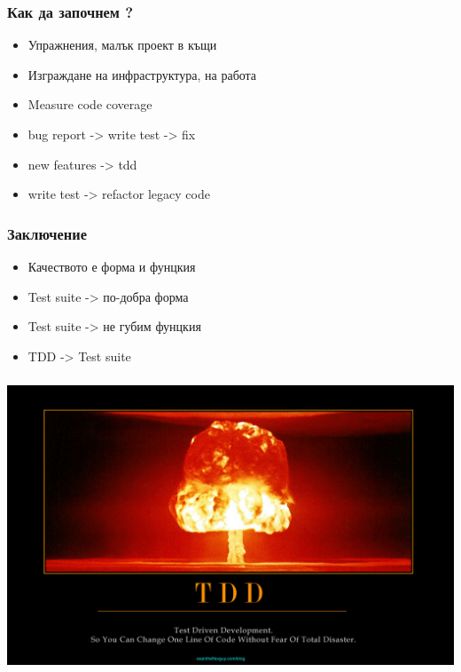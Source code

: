 \begin{frame}
  \frametitle{Как да започнем ?}
  \begin{itemize}
      \item Упражнения, малък проект в къщи
      \item Изграждане на инфраструктура, на работа
      \item Measure code coverage
      \item bug report -> write test -> fix
      \item new features -> tdd
      \item write test -> refactor legacy code
  \end{itemize}
\end{frame}

\begin{frame}
  \frametitle{Заключение}
  \begin{itemize}
      \item Качеството е форма и фунцкия
      \item Test suite -> по-добра форма
      \item Test suite -> не губим фунцкия
      \item TDD -> Test suite
  \end{itemize}
\end{frame}

\vspace*{-12.5mm}    
\begin{frame}
\frametitle{}
\hspace*{-11mm}
\includegraphics[width=\paperwidth, width=\paperwidth]{tdd.jpg}
\end{frame}

